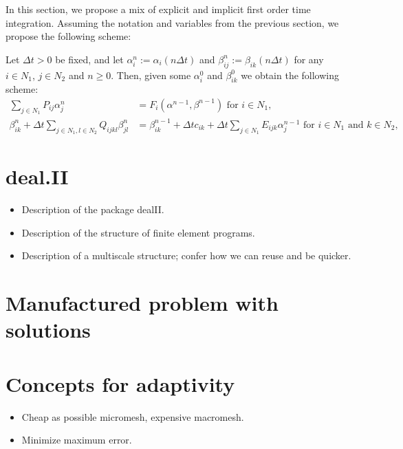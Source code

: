 \documentclass{article}
\begin{document}
In this section, we propose a mix of explicit and implicit first order time integration. Assuming the notation and variables from the previous section, we propose the following scheme:

Let $\Delta t>0$ be fixed, and let $\alpha_i^n := \alpha_i(n\Delta t)$ and $\beta_{ij}^n := \beta_{ik}(n\Delta t)$ for any $i\in N_1$, $j \in N_2$ and $n\geq0$. Then, given some $\alpha_i^0$ and $\beta_{ik}^0$ we obtain the following scheme:
\begin{align}
    \sum_{j\in N_1} P_{ij} \alpha_j^n &= F_i(\alpha^{n-1},\beta^{n-1})\label{eq:discr_alpha} \mbox{ for }i\in N_1,\\
    \beta_{ik}^{n} + \Delta t\sum_{j\in N_1,l\in N_2} Q_{ijkl} \beta_{jl}^{n} &= \beta_{ik}^{n-1} + \Delta tc_{ik} + \Delta t\sum_{j\in N_1} E_{ijk}\alpha_j^{n-1}\label{eq:discr_beta}\mbox{ for }i\in N_1\mbox{ and }k \in N_2,
\end{align}

\section{deal.II}
\label{sec:dealii}
\begin{itemize}
    \item Description of the package dealII.
    \item Description of the structure of finite element programs.
    \item Description of a multiscale structure; confer how we can reuse and be quicker.
\end{itemize}

\section{Manufactured problem with solutions}
\label{sec:manufactured}

\section{Concepts for adaptivity}
\label{sec:adaptivity}
\begin{itemize}
    \item Cheap as possible micromesh, expensive macromesh.
    \item Minimize maximum error.
\end{itemize}



\end{document}
